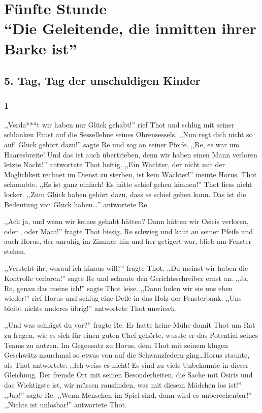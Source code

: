 \part*{Fünfte Stunde\\"`Die Geleitende, die inmitten ihrer Barke ist"'}

\chapter*{5. Tag, Tag der unschuldigen Kinder}

\section*{1}

,,Verda***t wir haben nur Glück gehabt!'' rief Thot und schlug mit seiner schlanken Faust auf die Sessellehne seines Ohrensessels. ,,Nun regt dich nicht so auf! Glück gehört dazu!'' sagte Re und sog an seiner Pfeife. ,,Re, es war um Haaresbreite! Und das ist auch übertrieben, denn wir haben einen Mann verloren letzte Nacht!'' antwortete Thot heftig. ,,Ein Wächter, der nicht mit der Möglichkeit rechnet im Dienst zu sterben, ist kein Wächter!'' meinte Horus. Thot schnaubte. ,,Es ist ganz einfach! Es hätte schief gehen können!'' Thot liess nicht locker. ,,Zum Glück haben gehört dazu, dass es schief gehen kann. Das ist die Bedeutung von Glück haben\dots '' antwortete Re.

,,Ach ja, und wenn wir keines gehabt hätten? Dann hätten wir Osiris verloren, oder \am, oder Maat!'' fragte Thot bissig. Re schwieg und kaut an seiner Pfeife und auch Horus, der unruhig im Zimmer hin und her getigert war, blieb am Fenster stehen. 

,,Versteht ihr, worauf ich hinaus will?'' fragte Thot. ,,Du meinst wir haben die Kontrolle verloren!'' sagte Re und schaute den Gerichtsschreiber ernst an. ,,Ja, Re, genau das meine ich!'' sagte Thot leise. ,,Dann holen wir sie uns eben wieder!'' rief Horus und schlug eine Delle in das Holz der Fensterbank. ,,Uns bleibt nichts anderes übrig!'' antwortete Thot unwirsch. 

,,Und was schlägst du vor?'' fragte Re. Er hatte keine Mühe damit Thot um Rat zu fragen, wie es sich für einen guten Chef gehörte, wusste er das Potential seines Teams zu nutzen. Im Gegensatz zu Horus, dem Thot mit seinem klugen Geschwätz manchmal so etwas von auf die Schwanzfedern ging\dots Horus staunte, als Thot antwortete: ,,Ich weiss es nicht! Es sind zu viele Unbekannte in dieser Gleichung. Der fremde Ort mit seinen Besonderheiten, die Sache mit Osiris und das Wichtigste ist, wir müssen rausfinden, was mit diesem Mädchen los ist!'' ,,Jaa!'' sagte Re. ,,Wenn Menschen im Spiel sind, dann wird es unberechenbar!'' ,,Nichts ist unlösbar!'' antwortete Thot.


